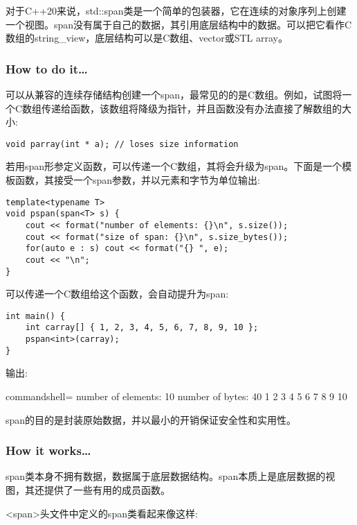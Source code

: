 
对于C++20来说，std::span类是一个简单的包装器，它在连续的对象序列上创建一个视图。span没有属于自己的数据，其引用底层结构中的数据。可以把它看作C数组的string\_view，底层结构可以是C数组、vector或STL array。

\subsubsection{How to do it…}

可以从兼容的连续存储结构创建一个span，最常见的的是C数组。例如，试图将一个C数组传递给函数，该数组将降级为指针，并且函数没有办法直接了解数组的大小:

\begin{lstlisting}[style=styleCXX]
void parray(int * a); // loses size information
\end{lstlisting}

若用span形参定义函数，可以传递一个C数组，其将会升级为span。下面是一个模板函数，其接受一个span参数，并以元素和字节为单位输出:

\begin{lstlisting}[style=styleCXX]
template<typename T>
void pspan(span<T> s) {
	cout << format("number of elements: {}\n", s.size());
	cout << format("size of span: {}\n", s.size_bytes());
	for(auto e : s) cout << format("{} ", e);
	cout << "\n";
}
\end{lstlisting}

可以传递一个C数组给这个函数，会自动提升为span:

\begin{lstlisting}[style=styleCXX]
int main() {
	int carray[] { 1, 2, 3, 4, 5, 6, 7, 8, 9, 10 };
	pspan<int>(carray);
}
\end{lstlisting}

输出:

\begin{tcblisting}{commandshell={}}
number of elements: 10
number of bytes: 40
1 2 3 4 5 6 7 8 9 10
\end{tcblisting}

span的目的是封装原始数据，并以最小的开销保证安全性和实用性。

\subsubsection{How it works…}

span类本身不拥有数据，数据属于底层数据结构。span本质上是底层数据的视图，其还提供了一些有用的成员函数。

<span>头文件中定义的span类看起来像这样:

